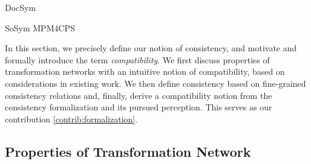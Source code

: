\begin{copiedFrom}{DocSym}

\end{copiedFrom} %



\begin{copiedFrom}{SoSym MPM4CPS}



In this section, we precisely define our notion of consistency, and motivate and formally introduce the term \emph{compatibility}.
We first discuss properties of transformation networks %
with an intuitive notion of compatibility, based on considerations in existing work.
We then define consistency based on fine-grained consistency relations and,
finally, derive a compatibility notion from the consistency formalization and its pursued perception.
This serves as our contribution \ref{contrib:formalization}.

\subsection{Properties of Transformation Network}
\label{sec:compatibility:networkproperties}


\end{copiedFrom}
